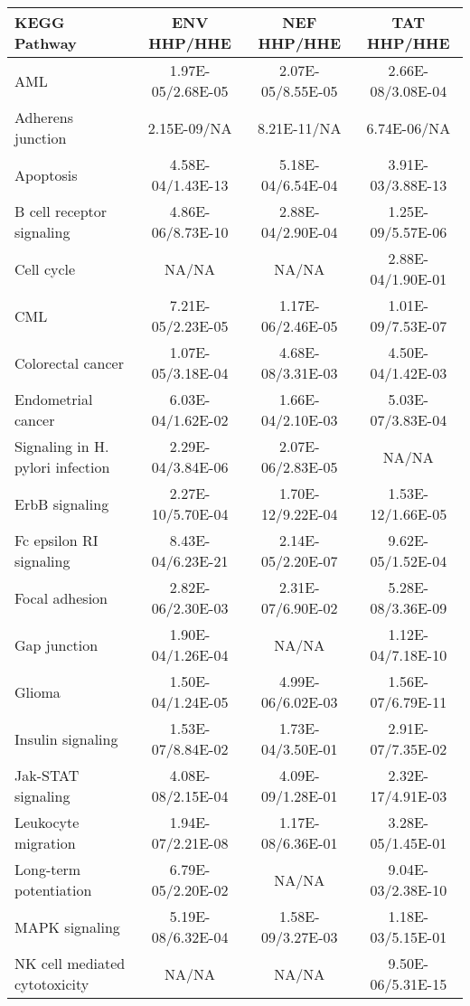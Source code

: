 \begin{table}\footnotesize
\begin{center}
  \begin{tabular}{|l|c|c|c|}
  \hline
  KEGG Pathway & ENV HHP/HHE & NEF HHP/HHE & TAT HHP/HHE\\
  \hline
AML & 1.97E-05/2.68E-05 & 2.07E-05/8.55E-05 & 2.66E-08/3.08E-04 \\
Adherens junction & 2.15E-09/NA & 8.21E-11/NA & 6.74E-06/NA \\
Apoptosis & 4.58E-04/1.43E-13 & 5.18E-04/6.54E-04 & 3.91E-03/3.88E-13 \\
B cell receptor signaling & 4.86E-06/8.73E-10 & 2.88E-04/2.90E-04 & 1.25E-09/5.57E-06 \\
Cell cycle & NA/NA & NA/NA & 2.88E-04/1.90E-01 \\
CML & 7.21E-05/2.23E-05 & 1.17E-06/2.46E-05 & 1.01E-09/7.53E-07 \\
Colorectal cancer & 1.07E-05/3.18E-04 & 4.68E-08/3.31E-03 & 4.50E-04/1.42E-03 \\
Endometrial cancer & 6.03E-04/1.62E-02 & 1.66E-04/2.10E-03 & 5.03E-07/3.83E-04 \\
Signaling in H. pylori infection & 2.29E-04/3.84E-06 & 2.07E-06/2.83E-05 & NA/NA \\
ErbB signaling & 2.27E-10/5.70E-04 & 1.70E-12/9.22E-04 & 1.53E-12/1.66E-05 \\
Fc epsilon RI signaling & 8.43E-04/6.23E-21 & 2.14E-05/2.20E-07 & 9.62E-05/1.52E-04 \\
Focal adhesion & 2.82E-06/2.30E-03 & 2.31E-07/6.90E-02 & 5.28E-08/3.36E-09 \\
Gap junction & 1.90E-04/1.26E-04 & NA/NA & 1.12E-04/7.18E-10 \\
Glioma & 1.50E-04/1.24E-05 & 4.99E-06/6.02E-03 & 1.56E-07/6.79E-11 \\
Insulin signaling & 1.53E-07/8.84E-02 & 1.73E-04/3.50E-01 & 2.91E-07/7.35E-02 \\
Jak-STAT signaling & 4.08E-08/2.15E-04 & 4.09E-09/1.28E-01 & 2.32E-17/4.91E-03 \\
Leukocyte migration & 1.94E-07/2.21E-08 & 1.17E-08/6.36E-01 & 3.28E-05/1.45E-01 \\
Long-term potentiation & 6.79E-05/2.20E-02 & NA/NA & 9.04E-03/2.38E-10 \\
MAPK signaling & 5.19E-08/6.32E-04 & 1.58E-09/3.27E-03 & 1.18E-03/5.15E-01 \\
NK cell mediated cytotoxicity & NA/NA & NA/NA & 9.50E-06/5.31E-15 \\

\end{tabular}
\end{center}
\end{table}
